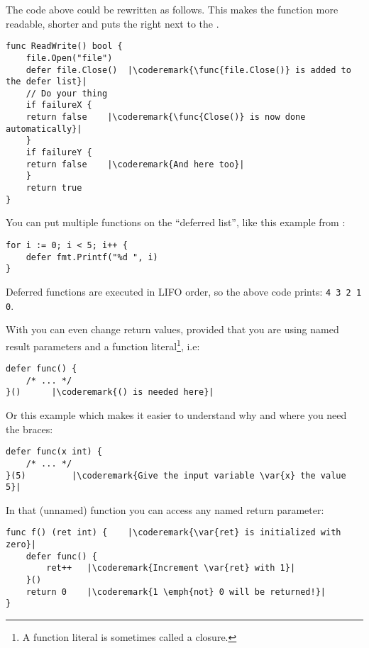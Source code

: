 The code above could be rewritten as follows. This makes the 
function more readable, shorter and puts the  right next 
to the .
\begin{lstlisting}[caption=With defer]
func ReadWrite() bool {
    file.Open("file")
    defer file.Close()	|\coderemark{\func{file.Close()} is added to the defer list}|
    // Do your thing
    if failureX {
	return false    |\coderemark{\func{Close()} is now done automatically}|
    }
    if failureY {
	return false    |\coderemark{And here too}|
    }
    return true
}
\end{lstlisting}
You can put multiple functions on the ``deferred list'', like this
example from \cite{effective_go}:
\begin{lstlisting}
for i := 0; i < 5; i++ { 
    defer fmt.Printf("%d ", i) 
} 
\end{lstlisting}
Deferred functions are executed in LIFO order, so the above code
prints: \lstinline{4 3 2 1 0}. 

With  you can even change return values, provided that
you are using named result parameters and a function
literal\footnote{A function literal
is sometimes called a  closure.}, i.e:
\begin{lstlisting}[caption=Function literal]
defer func() {
	/* ... */
}()		 |\coderemark{() is needed here}|
\end{lstlisting}
Or this example which makes it easier to understand why and where
you need the braces:
\begin{lstlisting}[caption=Function literal with parameters]
defer func(x int) {
	/* ... */
}(5)		 |\coderemark{Give the input variable \var{x} the value 5}|
\end{lstlisting}
In that (unnamed) function you can access any named return
parameter:
\begin{lstlisting}[caption=Access return values within defer]
func f() (ret int) {    |\coderemark{\var{ret} is initialized with zero}|
	defer func() {
		ret++	|\coderemark{Increment \var{ret} with 1}|
	}()
	return 0	|\coderemark{1 \emph{not} 0 will be returned!}|
}
\end{lstlisting}

